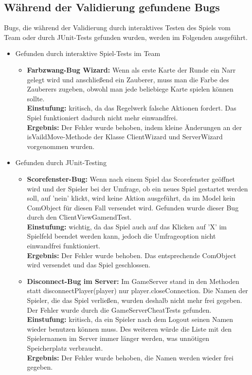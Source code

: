 \documentclass[a4paper]{article}
\begin{document}
\subsection{Während der Validierung gefundene Bugs}
	Bugs, die während der Validierung durch interaktives Testen des Spiels vom Team oder durch JUnit-Tests gefunden wurden, werden im Folgenden ausgeführt.
	\begin{itemize}
	\item Gefunden durch interaktive Spiel-Tests im Team
	\begin{itemize}
	\item{\textbf{Farbzwang-Bug Wizard:}} Wenn als erste Karte der Runde ein Narr gelegt wird und anschließend ein Zauberer, muss man die Farbe des Zauberers zugeben, obwohl man jede beliebiege Karte spielen können sollte.\\
	\textbf{Einstufung:} kritisch, da das Regelwerk falsche Aktionen fordert. Das Spiel funktioniert dadurch nicht mehr einwandfrei.\\
	\textbf{Ergebnis:} Der Fehler wurde behoben, indem kleine Änderungen an der isVaildMove-Methode der Klasse ClientWizard und ServerWizard vorgenommen wurden.
	\end{itemize}
	\item Gefunden durch JUnit-Testing
	\begin{itemize}
	\item{\textbf{Scorefenster-Bug:}} Wenn nach einem Spiel das Scorefenster geöffnet wird und der Spieler bei der Umfrage, ob ein neues Spiel gestartet werden soll, auf 'nein' klickt, wird keine Aktion ausgeführt, da im Model kein ComObject für diesen Fall versendet wird. Gefunden wurde dieser Bug durch den ClientViewGamendTest.\\
	\textbf{Einstufung:} wichtig, da das Spiel auch auf das Klicken auf 'X' im Spielfeld beendet werden kann, jedoch die Umfrageoption nicht einwandfrei funktioniert.\\
	\textbf{Ergebnis:} Der Fehler wurde behoben. Das entsprechende ComObject wird versendet und das Spiel geschlossen. 
	
	\item{\textbf{Disconnect-Bug im Server:}} Im GameServer stand in den Methoden statt disconnectPlayer(player) nur player.closeConnection. Die Namen der Spieler, die das Spiel verließen, wurden deshalb nicht mehr frei gegeben.
Der Fehler wurde durch die GameServerCheatTests gefunden.\\
	\textbf{Einstufung:} kritisch, da ein Spieler nach dem Logout seinen Namen wieder benutzen können muss. Des weiteren würde die Liste mit den Spielernamen im Server immer länger werden, was unnötigen Speicherplatz verbraucht.\\
	\textbf{Ergebnis:} Der Fehler wurde behoben, die Namen werden wieder frei gegeben.
	\end{itemize}
\end{itemize}
 
\end{document}
